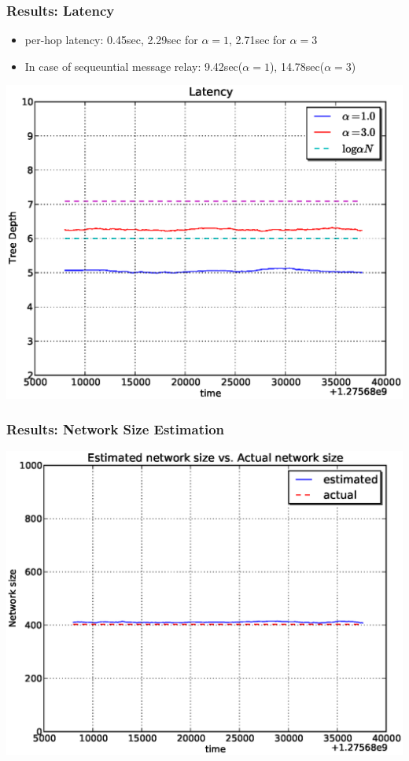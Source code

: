 \documentclass[red]{beamer}
\begin{document}
\begin{frame}
\frametitle{Results: Latency}
\begin{itemize}
\item per-hop latency: 0.45sec, 2.29sec for $\alpha=1$, 2.71sec for $\alpha=3$
\item In case of sequeuntial message relay: 9.42sec($\alpha=1$), 14.78sec($\alpha=3$)
\end{itemize}
\begin{center}
\includegraphics[scale=0.4]{figs/plab_depth.eps}
\end{center}
\end{frame}

\begin{frame}
\frametitle{Results: Network Size Estimation}
\begin{center}
\includegraphics[scale=0.4]{figs/plab_size.eps}
\end{center}
\end{frame}
\end{document}
